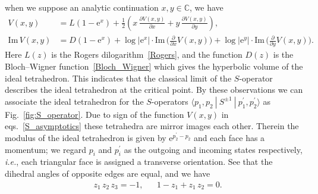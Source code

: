 \documentclass[12pt]{article}
\numberwithin{equation}{section}
\renewcommand{\Im}{\text{Im}}
\begin{document}
when we suppose an  analytic continuation  $x,y \in \mathbb{C}$,
we have
\begin{subequations}
  \label{property_V}
  \begin{align}
    V(x,y)
    & =
    L(1- \mathrm{e}^x)
    +
    \frac{1}{2}
    \left(
      x \, \frac{\partial V(x,y)}{\partial x}
      +
      y \, \frac{\partial V(x,y)}{\partial y}
    \right) ,
    \\[2mm]
%
    \Im \, V(x,y)
    & =
    D(1-\mathrm{e}^x)
    +
    \log | \mathrm{e}^x | \cdot
    \Im \, \biggl( \frac{\partial}{\partial x} V(x,y) \biggr) 
    +
    \log | \mathrm{e}^y | \cdot
    \Im \, \biggl( \frac{\partial}{\partial y} V(x,y) \biggr) .
  \end{align}
\end{subequations}
Here
$L(z)$ is  the Rogers dilogarithm~\eqref{Rogers}, and
the function $D(z)$
is the Bloch--Wigner
function~\eqref{Bloch_Wigner} which gives the hyperbolic volume of
the ideal tetrahedron.
This indicates that  the classical limit of
the $S$-operator
describes
the
ideal tetrahedron at the critical point.
By these observations we can associate the ideal tetrahedron for the
$S$-operators
$\langle p_1, p_2 \ | \ S^{\pm 1} \  | \ p_1^\prime , p_2^\prime \rangle$
as Fig.~\ref{fig:S_operator}.
Due to sign   of the function $V(x,y)$ in eqs.~\eqref{S_asymptotics}
these tetrahedra are mirror images each other.
Therein the modulus of the ideal tetrahedron is
given by $\mathrm{e}^{p_2^\prime - p_2}$ and each face has a momentum;
we regard $p_i$ and $p_i^\prime$ as the outgoing and incoming states
respectively,
\emph{i.e.},
each triangular face
is assigned a transverse orientation.
See that the dihedral angles of opposite edges are equal, and we have
\begin{align*}
  & z_1 \, z_2 \, z_3 = -1 ,
  &
  & 1 - z_1 + z_1 \, z_2 = 0 .
\end{align*}
\end{document}
